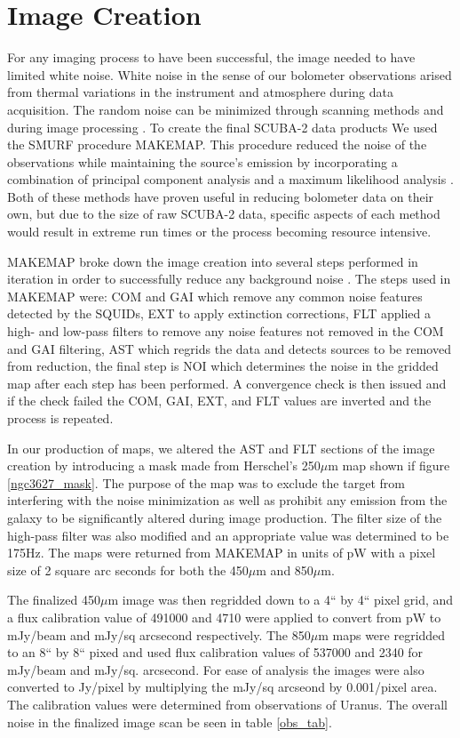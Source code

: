 \section{Image Creation}

For any imaging process to have been successful, the image needed to have limited white noise.  White noise in the sense of our bolometer observations arised from thermal variations in the instrument and atmosphere during data acquisition. The random noise can be minimized through scanning methods and during image processing \citet{chapin2013}.  To create the final SCUBA-2 data products We used the SMURF procedure MAKEMAP.  This procedure reduced the noise of the observations while maintaining the source's emission by incorporating a combination of principal component analysis and a maximum likelihood analysis \citet{chapin2013}.  Both of these methods have proven useful in reducing bolometer data on their own, but due to the size of raw SCUBA-2 data, specific aspects of each method would result in extreme run times or the process becoming resource intensive.

MAKEMAP broke down the image creation into several steps performed in iteration in order to successfully reduce any background noise \citet{chapin2013}.  The steps used in MAKEMAP were:  COM and GAI which remove any common noise features detected by the SQUIDs, EXT to apply extinction corrections, FLT applied  a high- and low-pass filters to remove any noise features not removed in the COM and GAI filtering, AST which regrids the data and detects sources to be removed from reduction, the final step is NOI which determines the noise in the gridded map after each step has been performed.  A convergence check is then issued and if the check failed the COM, GAI, EXT, and FLT values are inverted and the process is repeated.

In our production of maps, we altered the AST and FLT sections of the image creation by introducing a mask made from Herschel's 250$\mu$m map shown if figure \ref{ngc3627_mask}.  The purpose of the map was to exclude the target from interfering with the noise minimization as well as prohibit any emission from the galaxy to be significantly altered during image production.  The filter size of the high-pass filter was also modified and an appropriate value was determined to be 175Hz.  The maps were returned from MAKEMAP in units of pW with a pixel size of 2 square arc seconds for both the 450$\mu$m and 850$\mu$m.

The finalized 450$\mu$m image was then regridded down to a 4`` by 4`` pixel grid, and a flux calibration value of 491000 and 4710 were applied to convert from pW to mJy/beam and mJy/sq arcsecond respectively.  The 850$\mu$m maps were regridded to an 8`` by 8`` pixed and used flux calibration values of 537000 and 2340 for mJy/beam and mJy/sq. arcsecond.   For ease of analysis the images were also converted to Jy/pixel by multiplying the mJy/sq arcseond by 0.001/pixel area.  The calibration values were determined from observations of Uranus.   The overall noise in the finalized image scan be seen in table \ref{obs_tab}.

